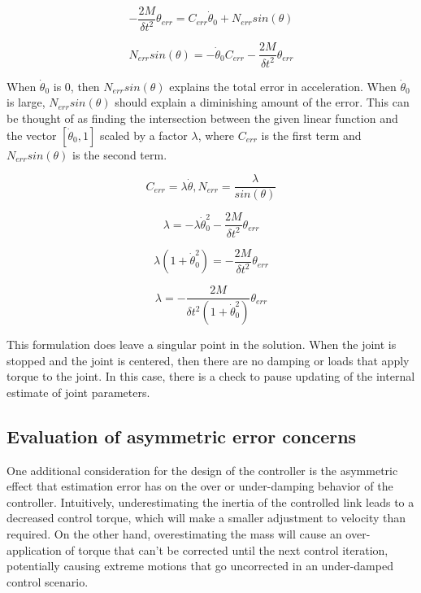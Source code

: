 \begin{equation}
- \dfrac{2M}{\delta t^{2}} \theta_{err} = C_{err} \dot{\theta}_{0} + N_{err} sin(\theta)
\end{equation}

\begin{equation}
N_{err} sin(\theta) = 
- \dot{\theta}_{0} C_{err}
- \dfrac{2M}{\delta t^{2}} \theta_{err}
\end{equation}

When $\dot{\theta}_{0}$ is 0, then $N_{err} sin(\theta)$ explains the total error in acceleration. When $\dot{\theta}_{0}$ is large, $N_{err} sin(\theta)$ should explain a diminishing amount of the error. This can be thought of as finding the intersection between the given linear function and the vector $[\dot{\theta}_{0}, 1]$ scaled by a factor $\lambda$, where $C_{err}$ is the first term and 
$N_{err} sin(\theta)$ is the second term.

\begin{equation}
C_{err} = \lambda \dot{\theta}, N_{err} = \dfrac{\lambda}{sin(\theta)}
\end{equation}

\begin{equation}
\lambda = 
- \lambda \dot{\theta}_{0}^{2}
- \dfrac{2M}{\delta t^{2}} \theta_{err}
\end{equation}

\begin{equation}
\lambda (1
+ \dot{\theta}_{0}^{2})
=
- \dfrac{2M}{\delta t^{2}} \theta_{err}
\end{equation}

\begin{equation}
\lambda 
=
- \dfrac{2M}{\delta t^{2} (1 + \dot{\theta}_{0}^{2})} \theta_{err}
\end{equation}

This formulation does leave a singular point in the solution. When the joint is stopped and the joint is centered, then there are no damping or loads that apply torque to the joint. In this case, there is a check to pause updating of the internal estimate of joint parameters.

\subsection{Evaluation of asymmetric error concerns}

One additional consideration for the design of the controller is the asymmetric
effect that estimation error has on the over or under-damping behavior of the
controller. Intuitively,
underestimating the inertia of the controlled link leads to a decreased control
torque, which will make a smaller adjustment to velocity than required. On the
other hand, overestimating the mass will cause an over-application of torque
that can't be corrected until the next control iteration, potentially causing
extreme motions that go uncorrected in an under-damped control scenario.

